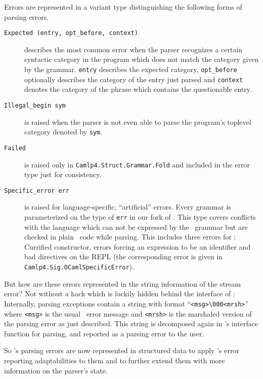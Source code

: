 Errors are represented in a variant type distinguishing the following forms of
parsing errors.
\begin{description}
    \item[\texttt{Expected~(entry,~opt\_before,~context)}] describes the most
      common error when the parser recognizes a certain syntactic category in
      the program which does not match the category given by the grammar.
      \texttt{entry} describes the expected category, \texttt{opt\_before}
      optionally describes the category of the entry just parsed and
      \texttt{context} denotes the category of the phrase which contains the
      questionable entry.
    \item[\texttt{Illegal\_begin~sym}] is raised when the parser is 
      not even able to parse the program's toplevel category denoted by
      \texttt{sym}.
    \item[\texttt{Failed}] is raised only in 
      \texttt{Camlp4.Struct.Grammar.Fold} and included in the error type just
      for consistency.
    \item[\texttt{Specific\_error~err}] is raised for language-specific,
      ``artificial'' errors.  Every grammar is parameterized on the type of
      \texttt{err} in our fork of \camlpf. This type covers conflicts with
      the language which can not be expressed by the \camlpf\ grammar but are
      checked in plain \ocaml\ code while parsing. 
      This includes three errors for \ocaml:
      Currified constructor, errors forcing an expression to be an identifier
      and bad directives on the REPL (the corresponding error is given in
      \texttt{Camlp4.Sig.OCamlSpecificError}).
\end{description}

But how are these errors represented in the string information of the stream
error? 
Not without a hack which is luckily hidden behind the interface of \camlpf:
Internally, parsing exceptions contain a string with format
``\texttt{<msg>\textbackslash 000<mrsh>}'' where \texttt{<msg>} is
the usual \camlpf\ error message and \texttt{<mrsh>} is the marshaled version
of the parsing error as just described.
This string is decomposed again in \camlpf's interface function for
parsing, and
reported as a parsing error to the user.

So \camlpf's parsing errors are now represented in structured data to
apply \easyocaml's error reporting adaptabilities to them and to further extend
them with more information on the parser's state.

